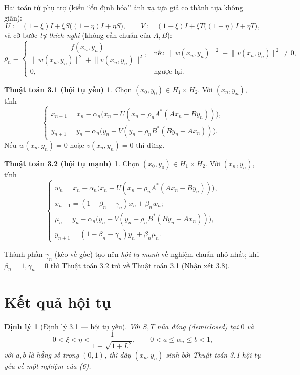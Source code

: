 \documentclass[11pt,a4paper]{article}
\theoremstyle{plain}
\newtheorem{theorem}{Định lý}
\theoremstyle{definition}
\newtheorem*{algoA}{Thuật toán 3.1 (hội tụ yếu)}
\newtheorem*{algoB}{Thuật toán 3.2 (hội tụ mạnh)}
\newcommand{\nm}[1]{\lVert #1\rVert}
\begin{document}
Hai toán tử phụ trợ (kiểu ``ổn định hóa'' ánh xạ tựa giả co thành tựa không giãn):
\[
U:=(1-\xi)I+\xi S\bigl((1-\eta)I+\eta S\bigr),\qquad V:=(1-\xi)I+\xi T\bigl((1-\eta)I+\eta T\bigr),
\]
và cỡ bước \emph{tự thích nghi} (không cần chuẩn của $A,B$):
\[
\rho_n=\begin{cases}\dfrac{f(x_n,y_n)}{\nm{w(x_n,y_n)}^2+\nm{v(x_n,y_n)}^2}, & \text{nếu } \nm{w(x_n,y_n)}^2+\nm{v(x_n,y_n)}^2\ne 0,\\[6pt]0,&\text{ngược lại.}\end{cases}
\]

\begin{algoA}
Chọn $(x_0,y_0)\in H_1\times H_2$. Với $(x_n,y_n)$, tính
\[
\begin{cases}
x_{n+1}=x_n-\alpha_n\bigl(x_n-U(x_n-\rho_n A^{*}(Ax_n-By_n))\bigr),\\
y_{n+1}=y_n-\alpha_n\bigl(y_n-V(y_n-\rho_n B^{*}(By_n-Ax_n))\bigr).
\end{cases} \tag{7}
\]
Nếu $w(x_n,y_n)=0$ hoặc $v(x_n,y_n)=0$ thì dừng.
\end{algoA}

\begin{algoB}
Chọn $(x_0,y_0)\in H_1\times H_2$. Với $(x_n,y_n)$, tính
\[
\begin{cases}
w_n=x_n-\alpha_n\bigl(x_n-U(x_n-\rho_n A^{*}(Ax_n-By_n))\bigr),\\
x_{n+1}=(1-\beta_n-\gamma_n)x_n+\beta_n w_n;\\
\mu_n=y_n-\alpha_n\bigl(y_n-V(y_n-\rho_n B^{*}(By_n-Ax_n))\bigr),\\
y_{n+1}=(1-\beta_n-\gamma_n)y_n+\beta_n\mu_n.
\end{cases} \tag{8}
\]
\end{algoB}
\noindent Thành phần $\gamma_n$ (kéo về gốc) tạo nên \emph{hội tụ mạnh} về nghiệm chuẩn nhỏ nhất; khi $\beta_n=1,\gamma_n=0$ thì Thuật toán 3.2 trở về Thuật toán 3.1 (Nhận xét 3.8).

\section{Kết quả hội tụ}

\begin{theorem}[Định lý 3.1 --- hội tụ yếu]
Với $S,T$ nửa đóng (demiclosed) tại $0$ và
\[
0<\xi<\eta<\frac{1}{1+\sqrt{1+L^2}},\qquad 0<a\le\alpha_n\le b<1,
\]
với $a,b$ là hằng số trong $(0,1)$, thì dãy $(x_n,y_n)$ sinh bởi Thuật toán 3.1 hội tụ \emph{yếu} về một nghiệm của (6).
\end{theorem}
\end{document}
